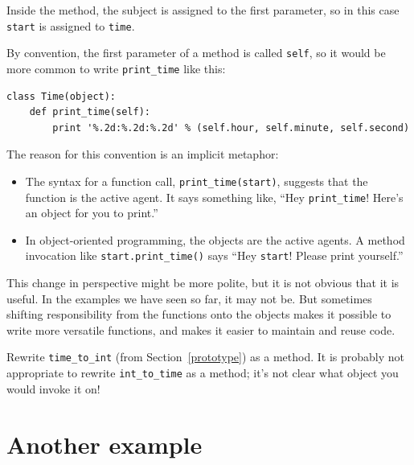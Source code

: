\documentclass[10pt]{book}
\begin{document}
{

Inside the method, the subject is assigned to the first
parameter, so in this case {\tt start} is assigned
to {\tt time}.


By convention, the first parameter of a method is
called {\tt self}, so it would be more common to write
\verb"print_time" like this:

\beforeverb
\begin{verbatim}
class Time(object):
    def print_time(self):
        print '%.2d:%.2d:%.2d' % (self.hour, self.minute, self.second)
\end{verbatim}
\afterverb
%
The reason for this convention is an implicit metaphor:


\begin{itemize}

\item The syntax for a function call, \verb"print_time(start)",
  suggests that the function is the active agent.  It says something
  like, ``Hey \verb"print_time"!  Here's an object for you to print.''

\item In object-oriented programming, the objects are the active
  agents.  A method invocation like \verb"start.print_time()" says
  ``Hey {\tt start}!  Please print yourself.''

\end{itemize}

This change in perspective might be more polite, but it is not obvious
that it is useful.  In the examples we have seen so far, it may not
be.  But sometimes shifting responsibility from the functions onto the
objects makes it possible to write more versatile functions, and makes
it easier to maintain and reuse code.

\begin{ex}
\label{convert}
Rewrite \verb"time_to_int"
(from Section~\ref{prototype}) as a method.  It is probably not
appropriate to rewrite \verb"int_to_time" as a method; it's not
clear what object you would invoke it on!
\end{ex}


\section{Another example}


}
\end{document}
